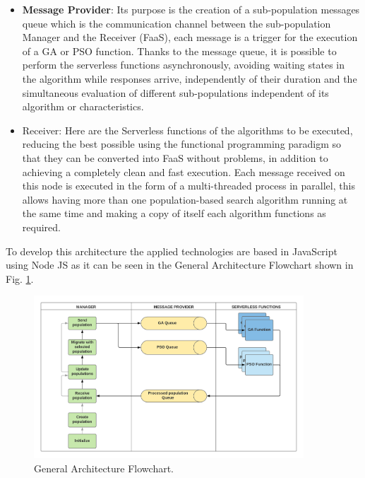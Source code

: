 \documentclass[runningheads]{llncs}
\begin{document}
\begin{itemize}
\item {\bf Message Provider}: Its purpose is the creation of a sub-population messages
  queue which is the communication channel %
  between the sub-population Manager and
the Receiver (FaaS), each message is a trigger for the execution of a GA or PSO
function. Thanks to the message queue, it is possible to perform the serverless
functions asynchronously, avoiding waiting states in the algorithm
while responses arrive, 
independently of their duration and the simultaneous evaluation of different
sub-populations independent of its algorithm or characteristics.
\item Receiver: Here are the Serverless
  functions of the %
algorithms to be executed, reducing the best possible using the functional
programming paradigm so that they can be converted into FaaS without problems,
in addition to achieving a completely clean and fast
execution\cite{Roberts2016}. Each message received on this node is executed in
the form of a multi-threaded process in parallel, this allows having more than
one population-based search algorithm running at the same time and making a copy
of itself each algorithm functions as required.
\end{itemize}

To develop this architecture the applied technologies are based in JavaScript
using Node JS as it can be seen in the General Architecture Flowchart
shown in Fig. \ref{flow}.

\begin{figure}[htp]
  \centering
  \includegraphics[width=0.9\textwidth]{img/Architecture diagram.png}
  \caption{General Architecture Flowchart.} \label{flow}
  \end{figure}
  
\end{document}
